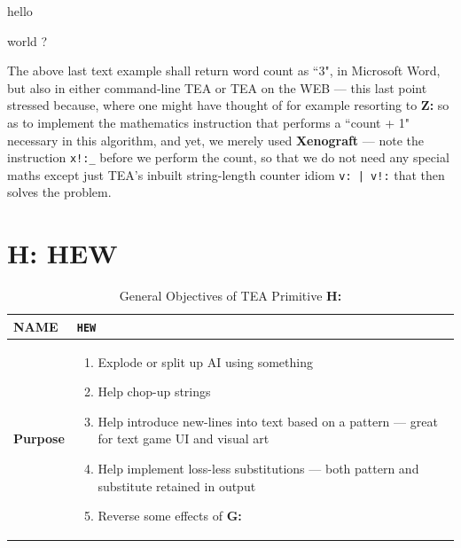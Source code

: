 \documentclass[a4paper, 18pt]{book} %
\begin{document}
  \begin{tcbverbatim}[title=Sample Input Text 3]
hello 


world ?
  \end{tcbverbatim}



The above last text example shall return word count as ``3", in Microsoft Word, but also in either command-line TEA or TEA on the WEB --- this last point stressed because, where one might have thought of for example resorting to \textbf{Z:} so as to implement the mathematics instruction that performs a ``count + 1" necessary in this algorithm, and yet, we merely used \textbf{Xenograft} --- note the instruction \texttt{x!:\_} before we perform the count, so that we do not need any special maths except just TEA's inbuilt string-length counter idiom \texttt{v: | v!:} that then solves the problem.





\chapter{H: HEW}
\label{CHAPH}


\begin{table}[H]
  \centering
  \LARGE
	\begin{tabular}[t]{|p{}|p{}}
 
	\textbf{NAME} & \texttt{HEW}\\
	\hline
	\textbf{Purpose} & \begin{enumerate}
	\item Explode or split up AI using something
	\item Help chop-up strings
	\item Help introduce new-lines into text based on a pattern --- {\small great for text game UI and visual art}
	\item Help implement loss-less substitutions --- both pattern and substitute retained in output
	\item Reverse some effects of \textbf{G:}
	\end{enumerate}\\
	\hline
	              
\end{tabular}
\caption{General Objectives of TEA Primitive \textbf{H:}}
  \label{TABTAZH}
\end{table}
\end{document}
